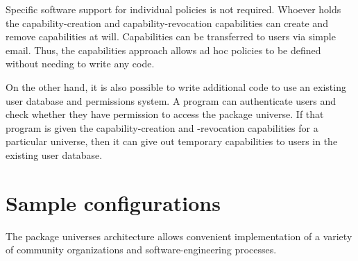 \documentclass{article}
\begin{document}
Specific software support for individual policies is not required.
Whoever holds the capability-creation and capability-revocation
capabilities can create and remove capabilities at will.  Capabilities
can be transferred to users via simple email.  Thus, the capabilities
approach allows ad hoc policies to be defined without needing to write
any code.

On the other hand, it is also possible to write additional code to use
an existing user database and permissions system.  A program can
authenticate users and check whether they have permission to access
the package universe.  If that program is given the
capability-creation and -revocation capabilities for a particular
universe, then it can give out temporary capabilities to users in the
existing user database.


\section{Sample configurations}
The package universes architecture allows convenient implementation of
a variety of community organizations and software-engineering
processes.
\end{document}
